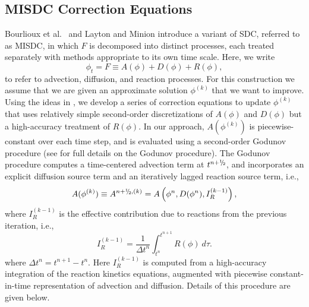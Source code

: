 \subsection{MISDC Correction Equations}
Bourlioux et al.~\cite{BLM:2003} and Layton and Minion \cite{Layton:2004}
introduce a variant of SDC, referred to as MISDC, in which $F$ is decomposed into distinct
processes, each treated separately with methods appropriate to its own time scale.  Here, we write
\begin{equation}
\phi_t = F \equiv A(\phi) + D(\phi) + R(\phi),\label{eq:multi}
\end{equation}
to refer to advection, diffusion, and reaction processes.
For this construction we assume that we are given an approximate solution $\phi^{(k)}$ that
we want to improve. 
Using the ideas in \cite{BLM:2003,Layton:2004}, we develop 
a series of correction equations to update $\phi^{(k)}$ that uses relatively
simple second-order discretizations of $A(\phi)$ and $D(\phi)$ but a high-accuracy 
treatment of $R(\phi)$.  In our approach, $A(\phi^{(k)})$ is piecewise-constant over 
each time step, and is evaluated using a second-order Godunov procedure 
(see \cite{almgren-iamr} for full details on the Godunov procedure).
The Godunov procedure computes a time-centered 
advection term at $t^{n+\myhalf}$, and incorporates an explicit diffusion source term and an 
iteratively lagged reaction source term, i.e.,
\begin{equation}
A(\phi^{(k)}) \equiv A^{n+\myhalf,(k)} = A\left(\phi^n,D(\phi^n),I_R^{(k-1)}\right),
\end{equation}
where $I_R^{(k-1)}$ is the effective contribution due to reactions from the previous iteration, i.e.,
\begin{equation}
I_R^{(k-1)} = \frac{1}{\Delta t^n}\int_{t^n}^{t^{n+1}} R(\phi)~d\tau.\label{eq:IR}
\end{equation}
where $\Delta t^n = t^{n+1} - t^n$.  Here $I_R^{(k-1)}$ is computed from a high-accuracy
integration of the reaction kinetics equations,
augmented with piecewise constant-in-time representation of advection and diffusion.
Details of this procedure are given below.

